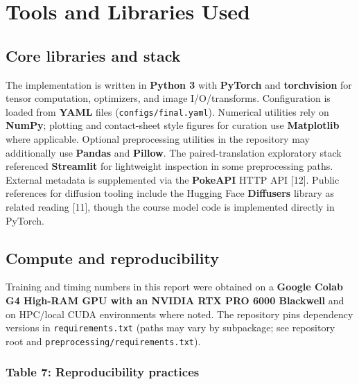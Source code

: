 \documentclass[
]{article}
\begin{document}
\section{Tools and Libraries
Used}\label{tools-and-libraries-used}

\subsection{Core libraries and stack}\label{core-libraries-and-stack}

The implementation is written in \textbf{Python 3} with \textbf{PyTorch}
and \textbf{torchvision} for tensor computation, optimizers, and image
I/O/transforms. Configuration is loaded from \textbf{YAML} files
(\texttt{configs/final.yaml}). Numerical utilities rely on
\textbf{NumPy}; plotting and contact-sheet style figures for curation use
\textbf{Matplotlib} where applicable. Optional preprocessing utilities in
the repository may additionally use \textbf{Pandas} and
\textbf{Pillow}. The paired-translation exploratory stack referenced
\textbf{Streamlit} for lightweight inspection in some preprocessing
paths. External metadata is supplemented via the \textbf{PokeAPI} HTTP
API {[}12{]}. Public references for diffusion tooling include the
Hugging Face \textbf{Diffusers} library as related reading {[}11{]},
though the course model code is implemented directly in PyTorch.

\subsection{Compute and reproducibility}\label{compute-and-reproducibility}

Training and timing numbers in this report were obtained on a
\textbf{Google Colab G4 High-RAM GPU with an NVIDIA RTX PRO 6000
Blackwell} and on HPC/local CUDA environments where noted. The
repository pins dependency versions in \texttt{requirements.txt} (paths
may vary by subpackage; see repository root and
\texttt{preprocessing/requirements.txt}).

\subsubsection{Table 7: Reproducibility practices}\label{table-7.-reproducibility}
\end{document}
